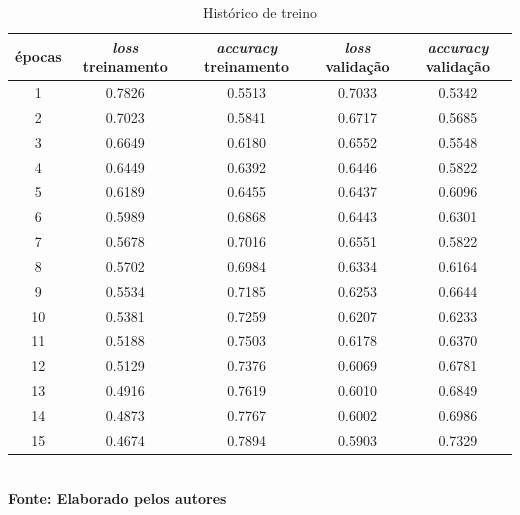 \begin{table}[h]
  \centering
  \caption{Histórico de treino}
   \label{tab:history10}
   \vspace{-0.2cm}
\begin{tabular}{|c|c|c|c|c|} 
  \hline
   épocas & \textit{loss} treinamento & \textit{accuracy} treinamento & \textit{loss} validação & \textit{accuracy} validação \\
  \hline
    1 & 0.7826 & 0.5513 & 0.7033 & 0.5342 \\
    2 & 0.7023 & 0.5841 & 0.6717 & 0.5685 \\
    3 & 0.6649 & 0.6180 & 0.6552 & 0.5548 \\
    4 & 0.6449 & 0.6392 & 0.6446 & 0.5822 \\
    5 & 0.6189 & 0.6455 & 0.6437 & 0.6096 \\
    6 & 0.5989 & 0.6868 & 0.6443 & 0.6301 \\
    7 & 0.5678 & 0.7016 & 0.6551 & 0.5822 \\
    8 & 0.5702 & 0.6984 & 0.6334 & 0.6164 \\
    9 & 0.5534 & 0.7185 & 0.6253 & 0.6644 \\
    10 & 0.5381 & 0.7259 & 0.6207 & 0.6233 \\ 
    11 & 0.5188 & 0.7503 & 0.6178 & 0.6370 \\
    12 & 0.5129 & 0.7376 & 0.6069 & 0.6781 \\
    13 & 0.4916 & 0.7619 & 0.6010 & 0.6849 \\
    14 & 0.4873 & 0.7767 & 0.6002 & 0.6986 \\
    15 & 0.4674 & 0.7894 & 0.5903 & 0.7329 \\
  \hline
\end{tabular}
	\vspace{0.2cm}
     \\\textbf{\footnotesize Fonte: Elaborado pelos autores}
\end{table}


